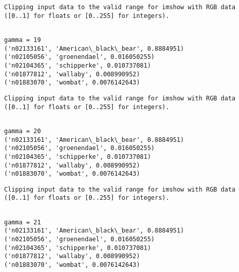 \documentclass[11pt]{article}
\begin{document}
    \begin{Verbatim}[commandchars=\\\{\}]
Clipping input data to the valid range for imshow with RGB data ([0..1] for floats or [0..255] for integers).

    \end{Verbatim}

    \begin{Verbatim}[commandchars=\\\{\}]

gamma = 19
('n02133161', 'American\_black\_bear', 0.8884951)
('n02105056', 'groenendael', 0.016050255)
('n02104365', 'schipperke', 0.010737081)
('n01877812', 'wallaby', 0.008990952)
('n01883070', 'wombat', 0.0076142643)

    \end{Verbatim}

    \begin{Verbatim}[commandchars=\\\{\}]
Clipping input data to the valid range for imshow with RGB data ([0..1] for floats or [0..255] for integers).

    \end{Verbatim}

    \begin{Verbatim}[commandchars=\\\{\}]

gamma = 20
('n02133161', 'American\_black\_bear', 0.8884951)
('n02105056', 'groenendael', 0.016050255)
('n02104365', 'schipperke', 0.010737081)
('n01877812', 'wallaby', 0.008990952)
('n01883070', 'wombat', 0.0076142643)

    \end{Verbatim}

    \begin{Verbatim}[commandchars=\\\{\}]
Clipping input data to the valid range for imshow with RGB data ([0..1] for floats or [0..255] for integers).

    \end{Verbatim}

    \begin{Verbatim}[commandchars=\\\{\}]

gamma = 21
('n02133161', 'American\_black\_bear', 0.8884951)
('n02105056', 'groenendael', 0.016050255)
('n02104365', 'schipperke', 0.010737081)
('n01877812', 'wallaby', 0.008990952)
('n01883070', 'wombat', 0.0076142643)

    \end{Verbatim}
\end{document}
